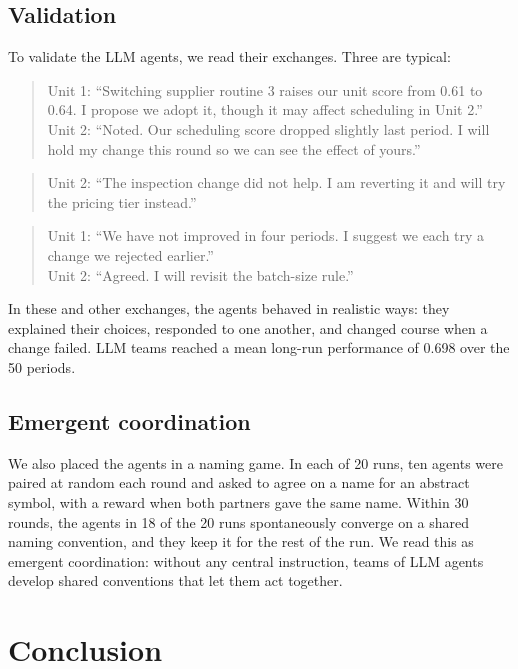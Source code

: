 \documentclass[11pt]{article}
\begin{document}
\subsection{Validation}

To validate the LLM agents, we read their exchanges. Three are typical:

\begin{quote}\small
Unit 1: ``Switching supplier routine 3 raises our unit score from 0.61 to 0.64. I propose we adopt it, though it may affect scheduling in Unit 2.''\\
Unit 2: ``Noted. Our scheduling score dropped slightly last period. I will hold my change this round so we can see the effect of yours.''
\end{quote}

\begin{quote}\small
Unit 2: ``The inspection change did not help. I am reverting it and will try the pricing tier instead.''
\end{quote}

\begin{quote}\small
Unit 1: ``We have not improved in four periods. I suggest we each try a change we rejected earlier.''\\
Unit 2: ``Agreed. I will revisit the batch-size rule.''
\end{quote}

In these and other exchanges, the agents behaved in realistic ways: they explained their choices, responded to one another, and changed course when a change failed. LLM teams reached a mean long-run performance of 0.698 over the 50 periods.

\subsection{Emergent coordination}

We also placed the agents in a naming game. In each of 20 runs, ten agents were paired at random each round and asked to agree on a name for an abstract symbol, with a reward when both partners gave the same name. Within 30 rounds, the agents in 18 of the 20 runs spontaneously converge on a shared naming convention, and they keep it for the rest of the run. We read this as emergent coordination: without any central instruction, teams of LLM agents develop shared conventions that let them act together.

\section{Conclusion}
\end{document}
